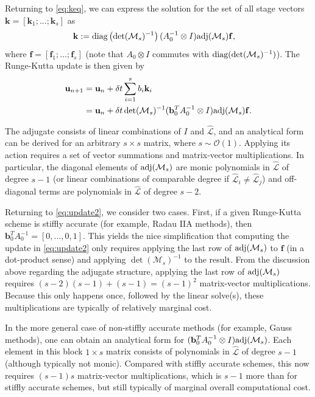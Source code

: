 \documentclass[review]{siamart}
\begin{document}
Returning to \eqref{eq:keq}, we can express the solution for the set of all
stage vectors ${\mathbf{k}} = [\mathbf{k}_1; ...; \mathbf{k}_s]$ as
%
\begin{align*}
\mathbf{k} &:= \textnormal{diag}\left(\det(\mathcal{M}_s)^{-1}\right)
	(A_0^{-1}\otimes I)\textnormal{adj}(\mathcal{M}_s)\mathbf{f},
\end{align*}
%
where $\mathbf{f} = [\mathbf{f}_1; ...; \mathbf{f}_s]$ (note that
$A_0\otimes I$ commutes with $\textnormal{diag}(\det(\mathcal{M}_s)^{-1})$).
The Runge-Kutta update is then given by
%
\begin{align}\nonumber
\mathbf{u}_{n+1} & = \mathbf{u}_n + \delta t\sum_{i=1}^s b_i{\mathbf{k}}_i \\
& = \mathbf{u}_n + \delta t\det(\mathcal{M}_s)^{-1}
	(\mathbf{b}_0^TA_0^{-1}\otimes I)\textnormal{adj}(\mathcal{M}_s)\mathbf{f}.\label{eq:update2}
\end{align}
%

\begin{remark}
The adjugate consists of linear combinations of $I$ and $\widehat{\mathcal{L}}$, and an
analytical form can be derived for an arbitrary $s\times s$ matrix, where
$s\sim\mathcal{O}(1)$.
Applying its action requires a set of vector summations
and matrix-vector multiplications. In particular, the diagonal elements of
$\textnormal{adj}(\mathcal{M}_s)$ are monic polynomials in $\widehat{\mathcal{L}}$ of
degree $s-1$ (or linear combinations of comparable degree if
$\widehat{\mathcal{L}}_i\neq\widehat{\mathcal{L}}_j$)
and off-diagonal terms are polynomials in $\widehat{\mathcal{L}}$ of degree $s-2$.

Returning to \eqref{eq:update2}, we consider two cases. First, if a given Runge-Kutta
scheme is stiffly accurate (for example, Radau IIA methods),
then $\mathbf{b}_0^TA_0^{-1} = [0,...,0,1]$. This yields
the nice simplification that computing the update in \eqref{eq:update2} only requires
applying the last row of $\textnormal{adj}(\mathcal{M}_s)$ to $\mathbf{f}$ (in a
dot-product sense) and applying $\det(\mathcal{M}_s)^{-1}$ to the result. From
the discussion above regarding the adjugate structure, applying the last row of
$\textnormal{adj}(\mathcal{M}_s)$ requires $(s-2)(s-1) + (s-1) = (s-1)^2$ matrix-vector
multiplications. Because this only happens once, followed by the linear solve(s),
these multiplications are typically of relatively marginal cost.

In the more general case of non-stiffly accurate methods (for example, Gauss
methods), one can obtain an analytical form for $(\mathbf{b}_0^TA_0^{-1}\otimes
I)\textnormal{adj}(\mathcal{M}_s)$. Each element in this block $1\times s$
matrix consists of polynomials in $\widehat{\mathcal{L}}$ of degree $s-1$
(although typically not monic). Compared with stiffly accurate schemes, this now
requires $(s-1)s$ matrix-vector multiplications, which is $s-1$ more than for
stiffly accurate schemes, but still typically of marginal overall computational
cost.
\end{remark}
\end{document}
